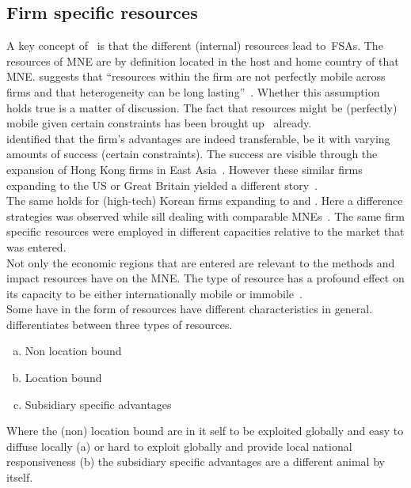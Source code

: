 \subsection{Firm specific resources}

A key concept of~\cite{Barney:1991ur,Barney:2001tj} is that the different (internal) resources lead to~\glspl{FSA}.
The resources of MNE are by definition located in the host and home country of that MNE\@. 
\cite{Barney:1991ur,Barney:1995tz} suggests that ``resources within the firm are not perfectly mobile across firms and that heterogeneity can be long lasting''~\citep{Barney:1991ur}.
Whether this assumption holds true is a matter of discussion.
The fact that resources might be (perfectly) mobile given certain constraints has been brought up~\citep{Lavie:2006up,Priem:2001vd} already.\\
\cite{Hu:1995vg} identified that the firm's advantages are indeed transferable, be it with varying amounts of success (certain constraints).
The success are visible through the expansion of Hong Kong firms in East Asia~\citep{Hu:1995vg}.
However these similar firms expanding to the US or Great Britain yielded a different story~\citep{Hu:1995vg}.\\
The same holds for (high-tech) Korean firms expanding to  and . 
Here a difference strategies was observed while sill dealing with comparable MNEs~\citep{Erramilli:1997wu}.
The same firm specific resources were employed in different capacities relative to the market that was entered.\\
Not only the economic regions that are entered are relevant to the methods and impact resources have on the MNE\@.
The type of resource has a profound effect on its capacity to be either internationally mobile or immobile~\citep{Tseng:2007wm}.\\
Some \fsa have in the form of resources have different characteristics in general. 
\cite{Rugman:2001ti} differentiates between three types of resources.
\begin{enumerate}[(a)]
   \setlength{\itemsep}{1pt}
\item Non location bound \fsa
\item Location bound \fsa 
\item Subsidiary specific advantages
\end{enumerate}
Where the (non) location bound \fsa are in it self to be exploited globally and easy to diffuse locally (a) or hard to exploit globally and provide local national responsiveness (b) the subsidiary specific advantages are a different animal by itself. 
